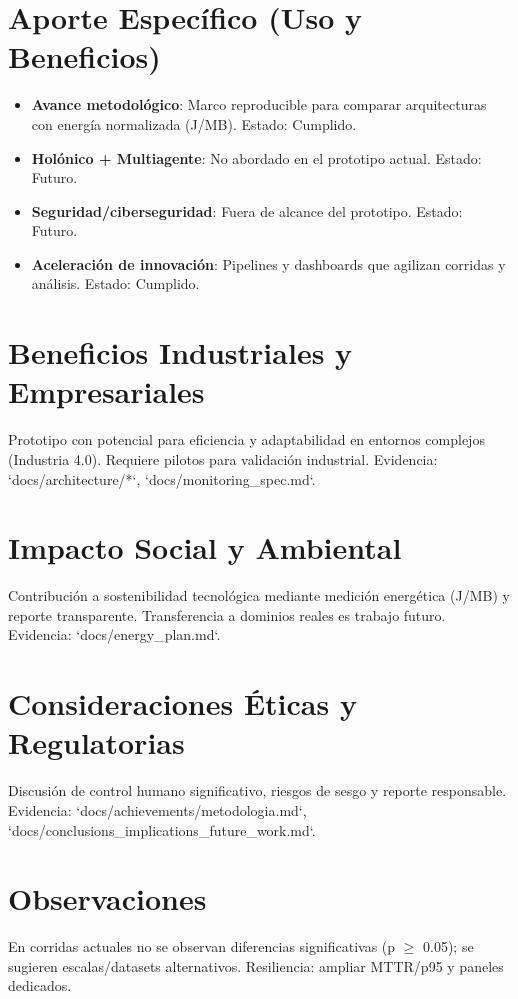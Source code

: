 \section{Aporte Específico (Uso y Beneficios)}
\begin{itemize}
  \item \textbf{Avance metodológico}: Marco reproducible para comparar arquitecturas con energía normalizada (J/MB). Estado: Cumplido.
  \item \textbf{Holónico + Multiagente}: No abordado en el prototipo actual. Estado: Futuro.
  \item \textbf{Seguridad/ciberseguridad}: Fuera de alcance del prototipo. Estado: Futuro.
  \item \textbf{Aceleración de innovación}: Pipelines y dashboards que agilizan corridas y análisis. Estado: Cumplido.
\end{itemize}

\section{Beneficios Industriales y Empresariales}
Prototipo con potencial para eficiencia y adaptabilidad en entornos complejos (Industria 4.0). Requiere pilotos para validación industrial. Evidencia: `docs/architecture/*`, `docs/monitoring_spec.md`.

\section{Impacto Social y Ambiental}
Contribución a sostenibilidad tecnológica mediante medición energética (J/MB) y reporte transparente. Transferencia a dominios reales es trabajo futuro. Evidencia: `docs/energy_plan.md`.

\section{Consideraciones Éticas y Regulatorias}
Discusión de control humano significativo, riesgos de sesgo y reporte responsable. Evidencia: `docs/achievements/metodologia.md`, `docs/conclusions_implications_future_work.md`.

\section*{Observaciones}
En corridas actuales no se observan diferencias significativas (p $\ge$ 0.05); se sugieren escalas/datasets alternativos. Resiliencia: ampliar MTTR/p95 y paneles dedicados.
